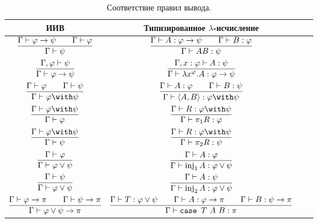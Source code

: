 \begin{table}[hp]
\centering
\begin{tabular}{Sc@{\hspace{1.5cm}} Sc} \toprule
    ИИВ & Типизированное $\lambda$-исчисление \\ \midrule

    $\infer{\Gamma \vdash \psi}{\Gamma \vdash \varphi \to \psi && \Gamma \vdash \varphi}$ &
    $\infer{\Gamma \vdash AB : \psi}{\Gamma \vdash A : \varphi \to \psi && \Gamma \vdash B : \varphi}$ \\ \addlinespace

    $\infer{\Gamma \vdash \varphi \to \psi}{\Gamma, \varphi \vdash \psi}$ &
    $\infer{\Gamma \vdash \lambda x^\varphi . A : \varphi \to \psi}{\Gamma, x : \varphi \vdash A : \psi}$ \\ \midrule

    $\infer{\Gamma \vdash \varphi \with \psi}{\Gamma \vdash \varphi && \Gamma \vdash \psi}$ &
    $\infer{\Gamma \vdash \left<A,B\right> : \varphi \with \psi}{\Gamma \vdash A : \varphi && \Gamma \vdash B : \psi}$ \\ \addlinespace

    $\infer{\Gamma \vdash \varphi}{\Gamma \vdash \varphi \with \psi}$ &
    $\infer{\Gamma \vdash \pi_1 R : \varphi}{\Gamma \vdash R : \varphi \with \psi}$ \\ \addlinespace

    $\infer{\Gamma \vdash \psi}{\Gamma \vdash \varphi \with \psi}$ &
    $\infer{\Gamma \vdash \pi_2 R : \psi}{\Gamma \vdash R : \varphi \with \psi}$ \\ \midrule

    $\infer{\Gamma \vdash \varphi \vee \psi}{\Gamma \vdash \varphi}$ &
    $\infer{\Gamma \vdash \inj_1 A : \varphi \vee \psi}{\Gamma \vdash A : \varphi}$ \\ \addlinespace

    $\infer{\Gamma \vdash \varphi \vee \psi}{\Gamma \vdash \psi}$ &
    $\infer{\Gamma \vdash \inj_2 A : \varphi \vee \psi}{\Gamma \vdash A : \psi}$ \\ \addlinespace

    $\infer{\Gamma \vdash \varphi \vee \psi \to \pi}
        {\Gamma \vdash \varphi \to \pi && \Gamma \vdash \psi \to \pi}$ &
    $\infer{\Gamma \vdash \case{T}{A}{B} : \pi}{\Gamma \vdash T : \varphi \vee \psi &&
        \Gamma \vdash A : \varphi \to \pi && \Gamma \vdash B : \psi \to \pi}$ \\ \bottomrule
\end{tabular}
\caption{Соответствие правил вывода.}
\label{correspondence-table}
\end{table}

